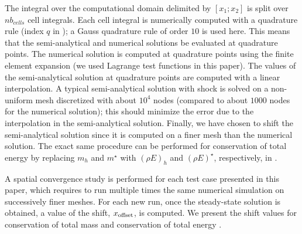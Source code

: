 \documentclass[times,doublespace]{fldauth}%
\begin{document}
The integral over the computational domain delimited by $[x_1; x_2]$ is split over $nb_{cells}$ cell integrals. Each cell integral is numerically computed with a quadrature rule (index $q$ in ); a Gauss quadrature rule of order $10$ is used here. This means that the semi-analytical and numerical solutions be evaluated at quadrature points. The numerical solution is computed at quadrature points using the finite element expansion (we used Lagrange test functions in this paper). The values of the semi-analytical solution at quadrature points are computed with a linear interpolation.
A typical semi-analytical solution with shock is solved on a non-uniform mesh discretized with about $10^4$ nodes (compared to about $1000$ nodes for the numerical solution); this should minimize the error due to the interpolation in the semi-analytical solution. Finally, we have chosen to shift the semi-analytical solution since it is computed on a finer mesh than the numerical solution. The exact same procedure can be performed for conservation of total energy by replacing $m_h$ and $m^\star$ with $(\rho E)_h$ and $(\rho E)^\star$, respectively, in .

A spatial convergence study is performed for each test case presented in this paper, which requires to run multiple times the same numerical simulation on successively finer meshes. For each new run, once the steady-state solution is obtained, a value of the shift, $x_{\text{\text{offset}}}$, is computed. We present the shift values for conservation of total mass and conservation of
total energy .
%
\end{document}
